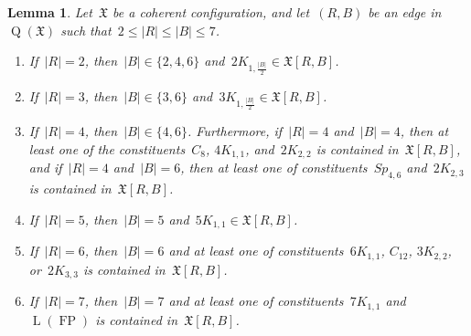 \documentclass[english,a4paper]{article}
\theoremstyle{plain}
\newtheorem{lemma}      [theorem]{Lemma}
\theoremstyle{definition}
\newcommand{\abs}[1]{| #1 |}
\newcommand{\coherentConfig}{\ensuremath{\mathfrak{X}}}
\newcommand{\interspace}[2]{\ensuremath{\coherentConfig[#1,#2]}}
\DeclareMathOperator*{\Quotient}{Q}
\newcommand{\quotientGraph}[1]{\ensuremath{\Quotient(#1)}}
\newcommand{\clique}[1]{\ensuremath{K_{#1}}}
\newcommand{\cycle}[1]{\ensuremath{C_{#1}}}
\newcommand{\disjointCliques}[2]{\ensuremath{#1 \clique{#2}}}
\DeclareMathOperator{\fanoPlane}{FP}
\DeclareMathOperator{\LeviGraph}{L}
\newcommand{\leviGraph}[1]{\ensuremath{\LeviGraph\!\left(#1\right)}}
\newcommand{\leviFano}{\leviGraph{\fanoPlane}}
\newcommand{\matching}[1]{\ensuremath{#1 K_{1,1}}}
\newcommand{\interspaceFourSix}{\ensuremath{Sp_{4,6}}}
\begin{document}
\begin{lemma}
    \label{small-cc:interspace/lem}
    Let~$\coherentConfig$ be a coherent configuration, and let~$(R,B)$ be an edge in~$\quotientGraph{\coherentConfig}$ such that~$2 \leq \abs{R} \leq \abs{B} \leq 7$.
    \begin{enumerate}[label=(\arabic*)]
        \item If~$\abs{R} = 2$,
        then~$\abs{B} \in \{2,4,6\}$ and~$\disjointCliques{2}{1,\frac{\abs{B}}{2}} \in \interspace{R}{B}$.
        \item If~$\abs{R} = 3$,
        then~$\abs{B} \in \{3,6\}$ and~$\disjointCliques{3}{1,\frac{\abs{B}}{2}} \in \interspace{R}{B}$.
        \item If~$\abs{R} = 4$, then~$\abs{B} \in \{4,6\}$.
        Furthermore, if~$\abs{R} = 4$ and~$\abs{B} = 4$, then at least one of the constituents~$\cycle{8}$, $\matching{4}$, and~$\disjointCliques{2}{2,2}$ is contained in~$\interspace{R}{B}$, and if~$\abs{R} = 4$ and~$\abs{B} = 6$, then at least one of constituents~$\interspaceFourSix$ and~$\disjointCliques{2}{2,3}$ is contained in~$\interspace{R}{B}$.
        \item If~$\abs{R} = 5$,
        then~$\abs{B} = 5$ and~$\matching{5} \in \interspace{R}{B}$.
        \item If~$\abs{R} = 6$,
        then~$\abs{B} = 6$ and at least one of constituents~$\matching{6}$, $\cycle{12}$, $\disjointCliques{3}{2,2}$, or~$\disjointCliques{2}{3,3}$ is contained in~$\interspace{R}{B}$.
        \item If~$\abs{R} = 7$,
        then~$\abs{B} = 7$ and at least one of constituents~$\matching{7}$ and~$\leviFano$ is contained in~$\interspace{R}{B}$.
    \end{enumerate}
\end{lemma}
\end{document}
